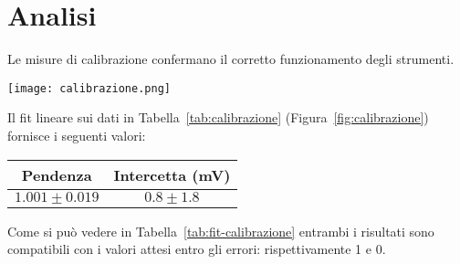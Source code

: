 \documentclass[@SRC@/main]{subfiles}
\begin{document}
\clearpage
\section{Analisi}
Le misure di calibrazione confermano il corretto funzionamento degli
strumenti.
\begin{center}
\begin{minipage}{.8\textwidth}
  \centering
  \texttt{[image: calibrazione.png]} 
  \label{fig:calibrazione}
\end{minipage}
\end{center}
\vspace{.25cm}
Il fit lineare sui dati in Tabella~\ref{tab:calibrazione}
(Figura~\ref{fig:calibrazione}) fornisce i seguenti valori:
\begin{center}
\begin{minipage}{.95\textwidth}
  \centering
  \begin{tabular}{||c|c||}
    \hline
    Pendenza & Intercetta (mV) \\
    \hline
    $1.001 \pm 0.019$ & $0.8 \pm 1.8$ \\
    \hline
  \end{tabular}
  \label{tab:fit-calibrazione}
\end{minipage}
\end{center}
Come si può vedere in Tabella~\ref{tab:fit-calibrazione} entrambi i risultati
sono compatibili con i valori attesi entro gli errori: rispettivamente 1 e 0. \\
\end{document}
